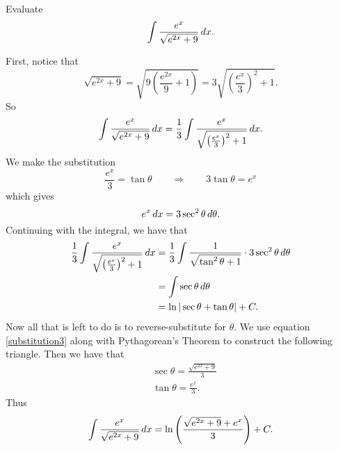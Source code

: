 \documentclass[]{ximera}
\begin{document}
\begin{problem}
Evaluate
	\[
	\int \frac{e^x}{\sqrt{e^{2x}+9}} \,d x.
	\]
	\begin{freeResponse}
	First, notice that
		\[
		\sqrt{e^{2x}+9} = \sqrt{9\left( \frac{e^{2x}}{9} + 1 \right)} = 3\sqrt{\left( \frac{e^x}{3} \right)^2 + 1}.
		\]
	So
		\[
		\int \frac{e^x}{\sqrt{e^{2x}+9}} \,d x = \frac{1}{3} \int \frac{e^x}{\sqrt{\left( \frac{e^x}{3} \right)^2 + 1}} \,d x.
		\]
	We make the substitution
		\begin{equation}\label{substitution3}
		\frac{e^x}{3} = \tan \theta 	\qquad	\Longrightarrow	\qquad	3\tan \theta = e^x
		\end{equation}
	which gives
		\[
		e^x \,d x = 3 \sec^2 \theta \,d \theta.
		\]
	Continuing with the integral, we have that
		\begin{align*}
		\frac{1}{3} \int \frac{e^x}{\sqrt{\left( \frac{e^x}{3} \right)^2 + 1}} \,d x
		&= \frac{1}{3} \int \frac{1}{\sqrt{\tan^2 \theta + 1}} \cdot 3 \sec^2 \theta \,d \theta  \\
		&= \int \sec \theta \,d \theta  \\
		&= \ln | \sec \theta + \tan \theta | + C.
		\end{align*}
	Now all that is left to do is to reverse-substitute for $\theta$. 
	We use equation \eqref{substitution3} along with Pythagorean's Theorem to construct the following triangle.
	Then we have that
		\begin{align*}
		&\sec \theta = \frac{\sqrt{e^{2x}+9}}{3} \\
		&\tan \theta = \frac{e^x}{3}.
		\end{align*}
	Thus
		\[
		\int \frac{e^x}{\sqrt{e^{2x}+9}} \,d x = \ln \left( \frac{\sqrt{e^{2x}+9} + e^x}{3} \right) + C.
		\]
	\end{freeResponse}

\end{problem}

\begin{instructorNotes}

\end{instructorNotes}
\end{document}
